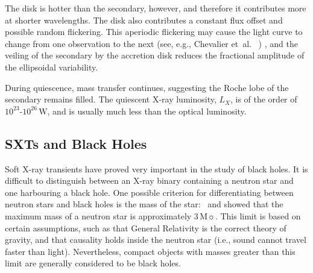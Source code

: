 \vspace{\myparskip}

The disk is hotter than the secondary, however, and therefore it contributes more at shorter wavelengths.
The disk also contributes a constant flux offset and
possible random flickering. This aperiodic flickering may cause the light curve to change
from one observation to the next (see, e.g., Chevalier et~al.\ %
)%
, and the veiling of the secondary by the accretion disk reduces the
fractional amplitude of the ellipsoidal variability. %

\vspace{\myparskip}

During quiescence, mass transfer continues, suggesting the Roche lobe
of the secondary remains filled. The quiescent X-ray luminosity,
$L_X$, is of the order of $10^{23}$-$10^{26}\,\mathrm{W}$, and is
usually much less than the optical luminosity.


\subsection{SXTs and Black Holes}\label{cha:Introduction:sec:X-rayBinaries:subsec:BHCSXTs}

Soft X-ray transients have proved very important in the study of
black holes. It is difficult to distinguish between an X-ray binary containing a neutron star and one harbouring a black hole. One possible criterion for differentiating between neutron stars and
black holes is the mass of the star: %
\ and %
showed that the maximum mass of a neutron star is approximately
$3\,\mathrm{M}\sun$. %
This limit is based on certain assumptions, such as that General Relativity
is the correct theory of gravity, and that causality holds inside the
neutron star (i.e., sound cannot travel faster than light). Nevertheless, compact objects with masses greater than this limit are generally considered to be black holes.

\vspace{\myparskip}

